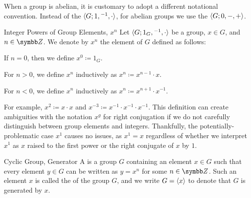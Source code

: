 When a group is abelian, it is customary to adopt a different notational convention. Instead of the  ${\langle {G; 1, {}^{-1}, \cdot} \rangle}$, for abelian groups we use the  ${\langle {G; 0, -, +} \rangle}$.

\begin{dfnbox}{Integer Powers of Group Elements, $x^n$}
	Let ${\langle {G; 1_G, {}^{-1}, \cdot} \rangle}$ be a group, $x \in G$, and $n \in \Z$. We denote by $x^n$ the element of $G$ defined as follows:
	\begin{dfnitems}
		\item If $n = 0$, then we define $x^0 \coloneq 1_G$.
		\item For $n > 0$, we define $x^n$ inductively as $x^n \coloneq x^{n-1} \cdot x$.
		\item For $n < 0$, we define $x^n$ inductively as $x^n \coloneq x^{n+1} \cdot x^{-1}$.
	\end{dfnitems}
\end{dfnbox}

For example, $x^2 \coloneq x \cdot x$ and $x^{-3} \coloneq x^{-1} \cdot x^{-1} \cdot x^{-1}$. This definition can create ambiguities with the notation $x^g$ for right conjugation if we do not carefully distinguish between group elements and integers. Thankfully, the potentially-problematic case $x^1$ causes no issues, as $x^1 = x$ regardless of whether we interpret $x^1$ as $x$ raised to the first power or the right conjugate of $x$ by $1$.

\begin{dfnbox}{Cyclic Group, Generator}
	A  is a group $G$ containing an element $x \in G$ such that every element $y \in G$ can be written as $y = x^n$ for some $n \in \Z$. Such an element $x$ is called the  of the group $G$, and we write $G = {\langle {x} \rangle}$ to denote that $G$ is generated by $x$.
\end{dfnbox}
